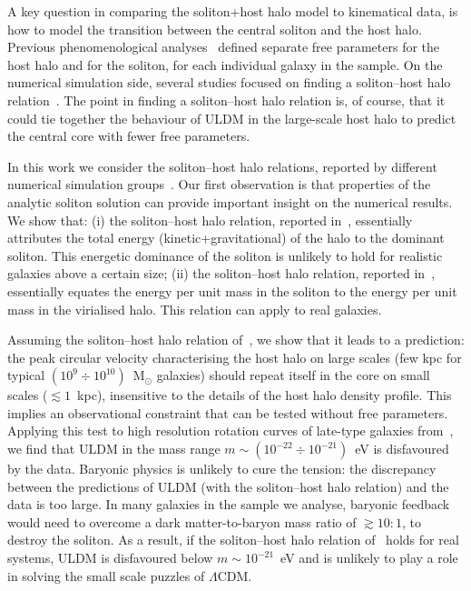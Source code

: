 \documentclass[aps,prd,floats,superscriptaddress,showpacs,nofootinbib,twocolumn,preprintnumbers]{revtex4-1}%
\begin{document}
A key question in comparing the soliton+host halo model to kinematical
data, is how to model the transition between the central soliton and
the host halo. Previous phenomenological analyses~\cite{Marsh:2015wka,Gonzales-Morales:2016mkl,Robles:2012uy,Bernal:2017oih}
defined separate free parameters for the host halo and for the
soliton, for each individual galaxy in the sample. On the numerical
simulation side, several studies focused on finding a soliton--host
halo
relation~\cite{Schive:2014dra,Mocz:2017wlg,Veltmaat:2016rxo,Schwabe:2016rze}.  
The point in finding a soliton--host halo relation is, of course, that
it could tie together the behaviour of ULDM in the large-scale host
halo to predict the central core with fewer free parameters. 

In this work we consider the soliton--host halo relations, reported by
different numerical simulation
groups~\cite{Schive:2014dra,Schive:2014hza,Mocz:2017wlg,Veltmaat:2016rxo,Schwabe:2016rze}. Our
first observation is that properties of the analytic soliton solution
can provide important insight on the numerical results. We show that:  
%
(i) the soliton--host halo relation, reported in~\cite{Mocz:2017wlg},
essentially attributes the total energy (kinetic+gravitational) of the
halo to the dominant soliton. This energetic dominance of the soliton
is unlikely to hold for realistic galaxies above a certain size; 
%
(ii) the soliton--host halo relation, reported
in~\cite{Schive:2014hza}, essentially equates the energy per unit mass
in the soliton to the energy per unit mass in the virialised halo. This
relation can apply to real galaxies.  
%

Assuming the soliton--host halo relation
of~\cite{Schive:2014hza}, we show that it 
leads to a prediction: the peak circular velocity
characterising the host halo on large scales (few kpc for typical
$(10^9\div 10^{10})$~M$_\odot$ galaxies) should repeat itself in
the core on small scales ($\lesssim1$~kpc), insensitive to the details
of the host halo density profile. This implies an observational
constraint that can be tested without free parameters. Applying this
test to high resolution rotation curves of late-type galaxies
from~\cite{deBlok:2002vgq,Lelli:2016zqa}, we find that ULDM
in the mass range $m\sim (10^{-22}\div 10^{-21})$~eV is disfavoured
by the data. Baryonic physics is unlikely to cure the tension: the discrepancy between the predictions of ULDM (with the
soliton--host halo relation) and the data is too large. In many galaxies in the sample we analyse, baryonic feedback would need to overcome a dark matter-to-baryon mass ratio of $\gtrsim10:1$, to destroy the
soliton. 
As a result, if the soliton--host halo relation
of~\cite{Schive:2014dra,Schive:2014hza} holds for real systems, 
ULDM is disfavoured 
below $m\sim10^{-21}$~eV and is unlikely to play a role in solving the small
scale puzzles of $\Lambda$CDM. 
\end{document}
